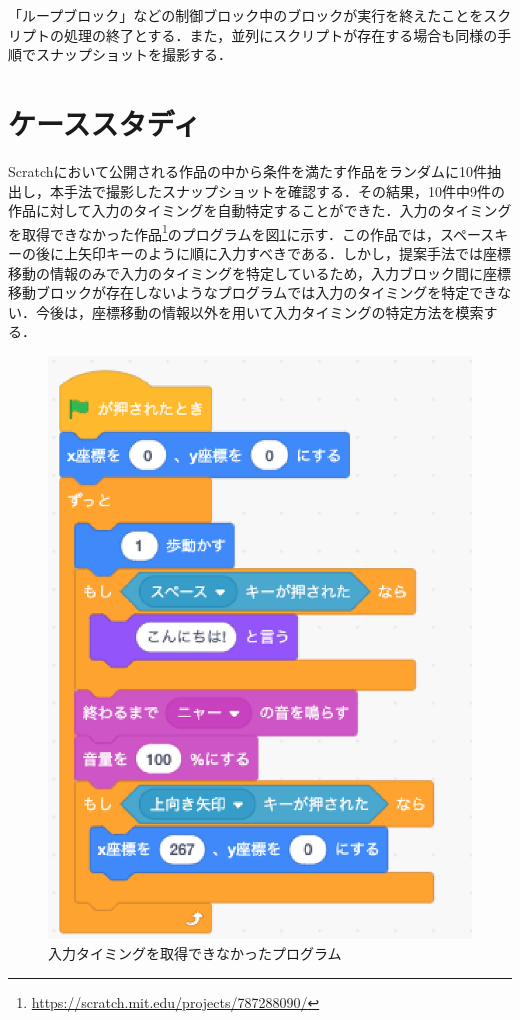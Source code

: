 \documentclass[uplatex,dvipdfmx,a4paper,twocolumn,base=11pt,jbase=11pt,ja=standard]{bxjsarticle}  %
\begin{document}

「ループブロック」などの制御ブロック中のブロックが実行を終えたことをスクリプトの処理の終了とする．また，並列にスクリプトが存在する場合も同様の手順でスナップショットを撮影する．

\section{ケーススタディ}

Scratchにおいて公開される作品の中から条件を満たす作品をランダムに10件抽出し，本手法で撮影したスナップショットを確認する．その結果，10件中9件の作品に対して入力のタイミングを自動特定することができた．入力のタイミングを取得できなかった作品\footnote{\url{https://scratch.mit.edu/projects/787288090/}}のプログラムを図\ref{fig:input}に示す．この作品では，スペースキーの後に上矢印キーのように順に入力すべきである．しかし，提案手法では座標移動の情報のみで入力のタイミングを特定しているため，入力ブロック間に座標移動ブロックが存在しないようなプログラムでは入力のタイミングを特定できない．今後は，座標移動の情報以外を用いて入力タイミングの特定方法を模索する．

\begin{figure}
    \begin{center}
        \includegraphics[width=0.5\linewidth]{program.eps}
        \caption{入力タイミングを取得できなかったプログラム}
        \label{fig:input}
    \end{center}
\vspace{-8mm}
\end{figure}
\end{document}

